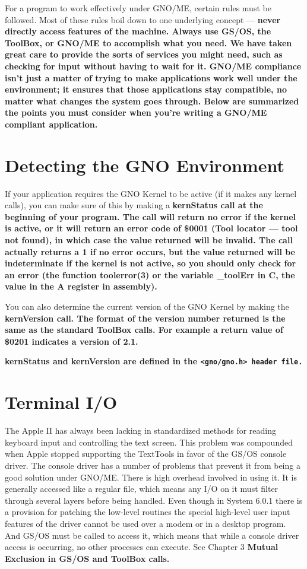 \documentclass{report}
\begin{document}
For a program to work effectively under
GNO/ME, certain rules must be followed. Most of these rules boil
down to one underlying concept --- 
\bf never directly access features of the machine\rm .
Always use GS/OS, the ToolBox, or
GNO/ME to accomplish what you need. We have taken great care to
provide the sorts of services you might need, such as checking
for input without having to wait for it. GNO/ME compliance isn't
just a matter of trying to make applications work well under the
environment; it ensures that those applications stay compatible,
no matter what changes the system goes through. Below are
summarized the points you must consider when you're writing a
GNO/ME compliant application.

\section{Detecting the GNO Environment}

If your application requires the GNO Kernel
to be active (if it makes any kernel calls), you can make sure of
this by making a \bf kernStatus \rm  call at the beginning of your
program. The call will return no error if the kernel is active,
or it will return an error code of \$0001 (Tool locator --- tool not
found), in which case the value returned will be invalid. The
call actually returns a 1 if no error occurs, but the value
returned will be indeterminate if the kernel is not active, so
you should only check for an error (the function  
 \bf toolerror\rm (3) or the variable 
 \bf \_{}toolErr \rm in C,
the value in the A register in assembly).

You can also determine the current version
of the GNO Kernel by making the \bf kernVersion \rm call. The
format of the version number returned is the same as the standard
ToolBox calls. For example a return value of \$0201 indicates a
version of 2.1.

\bf kernStatus \rm and \bf kernVersion \rm 
are defined in the \tt <gno/gno.h> \rm
header file.

\section{Terminal I/O}

The Apple II has always been lacking in
standardized methods for reading keyboard input and controlling
the text screen. This problem was compounded when Apple stopped
supporting the TextTools in favor of the GS/OS 
 console driver.
The console driver has a number of problems that prevent it from
being a good solution under GNO/ME. There is high overhead
involved in using it. It is generally accessed like a regular
file, which means any I/O on it must filter through several
layers before being handled. Even though in System 6.0.1 there is
a provision for patching the low-level routines the special
high-level user input features of the driver cannot be used over
a modem or in a desktop program. And GS/OS must be called to
access it, which means that while a console driver access is
occurring, no other processes can execute. See Chapter 3 \bf Mutual
Exclusion in GS/OS and ToolBox calls\rm .
\end{document}

